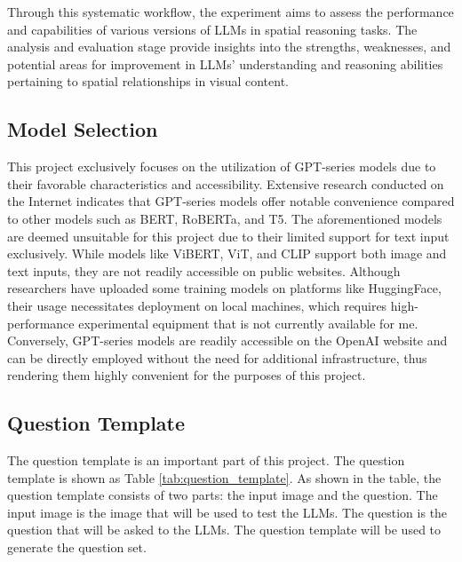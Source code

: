 \documentclass[journal,10pt]{IEEEtran}
\begin{document}
Through this systematic workflow, the experiment aims to assess the performance and capabilities of various versions of LLMs in spatial reasoning tasks. The analysis and evaluation stage provide insights into the strengths, weaknesses, and potential areas for improvement in LLMs' understanding and reasoning abilities pertaining to spatial relationships in visual content.

\subsection{Model Selection}
This project exclusively focuses on the utilization of GPT-series models due to their favorable characteristics and accessibility. Extensive research conducted on the Internet indicates that GPT-series models offer notable convenience compared to other models such as BERT, RoBERTa, and T5. The aforementioned models are deemed unsuitable for this project due to their limited support for text input exclusively. While models like ViBERT, ViT, and CLIP support both image and text inputs, they are not readily accessible on public websites. Although researchers have uploaded some training models on platforms like HuggingFace, their usage necessitates deployment on local machines, which requires high-performance experimental equipment that is not currently available for me. Conversely, GPT-series models are readily accessible on the OpenAI website and can be directly employed without the need for additional infrastructure, thus rendering them highly convenient for the purposes of this project.

\subsection{Question Template}
The question template is an important part of this project. The question template is shown as Table \ref{tab:question_template}. As shown in the table, the question template consists of two parts: the input image and the question. The input image is the image that will be used to test the LLMs. The question is the question that will be asked to the LLMs. The question template will be used to generate the question set.
\end{document}
